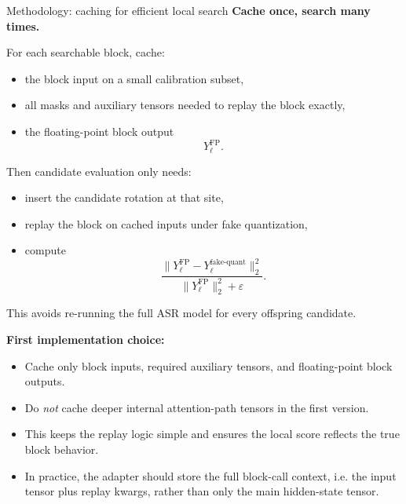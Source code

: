 \documentclass[aspectratio=169,11pt]{beamer}
\begin{document}
\begin{frame}{Methodology: caching for efficient local search}
\textbf{Cache once, search many times.}

\vspace{0.2cm}
For each searchable block, cache:
\begin{itemize}
  \item the block input on a small calibration subset,
  \item all masks and auxiliary tensors needed to replay the block exactly,
  \item the floating-point block output
  \[
  Y_{\ell}^{\mathrm{FP}}.
  \]
\end{itemize}

\vspace{0.2cm}
Then candidate evaluation only needs:
\begin{itemize}
  \item insert the candidate rotation at that site,
  \item replay the block on cached inputs under fake quantization,
  \item compute
  \[
  \frac{\|Y_{\ell}^{\mathrm{FP}}-Y_{\ell}^{\mathrm{fake\text{-}quant}}\|_2^2}
  {\|Y_{\ell}^{\mathrm{FP}}\|_2^2+\varepsilon}.
  \]
\end{itemize}

\vspace{0.2cm}
This avoids re-running the full ASR model for every offspring candidate.

\vspace{0.2cm}
\textbf{First implementation choice:}
\begin{itemize}
  \item Cache only block inputs, required auxiliary tensors, and floating-point block outputs.
  \item Do \emph{not} cache deeper internal attention-path tensors in the first version.
  \item This keeps the replay logic simple and ensures the local score reflects the true block behavior.
  \item In practice, the adapter should store the full block-call context, i.e. the input tensor plus replay kwargs, rather than only the main hidden-state tensor.
\end{itemize}
\end{frame}
\end{document}
